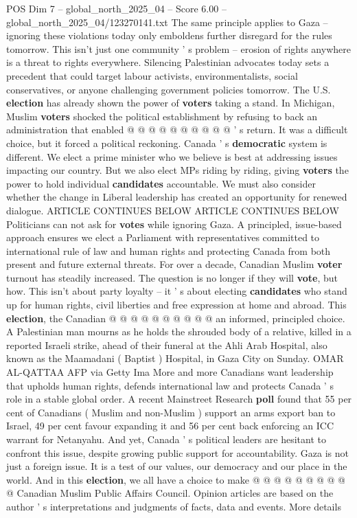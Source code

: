 \begin{textsample}{POS Dim 7 – global\_north\_2025\_04 – Score 6.00 – global\_north\_2025\_04/123270141.txt}
The same principle applies to Gaza -- ignoring these violations today only emboldens further disregard for the rules tomorrow.
This isn't just one community ' s problem -- erosion of rights anywhere is a threat to rights everywhere.
Silencing Palestinian advocates today sets a precedent that could target labour activists, environmentalists, social conservatives, or anyone challenging government policies tomorrow.
The U.S. \textbf{election} has already shown the power of \textbf{voters} taking a stand.
In Michigan, Muslim \textbf{voters} shocked the political establishment by refusing to back an administration that enabled @ @ @ @ @ @ @ @ @ @ ' s return.
It was a difficult choice, but it forced a political reckoning.
Canada ' s \textbf{democratic} system is different.
We elect a prime minister who we believe is best at addressing issues impacting our country.
But we also elect MPs riding by riding, giving \textbf{voters} the power to hold individual \textbf{candidates} accountable.
We must also consider whether the change in Liberal leadership has created an opportunity for renewed dialogue.
ARTICLE CONTINUES BELOW ARTICLE CONTINUES BELOW Politicians can not ask for \textbf{votes} while ignoring Gaza.
A principled, issue-based approach ensures we elect a Parliament with representatives committed to international rule of law and human rights and protecting Canada from both present and future external threats.
For over a decade, Canadian Muslim \textbf{voter} turnout has steadily increased.
The question is no longer if they will \textbf{vote}, but how.
This isn't about party loyalty -- it ' s about electing \textbf{candidates} who stand up for human rights, civil liberties and free expression at home and abroad.
This \textbf{election}, the Canadian @ @ @ @ @ @ @ @ @ @ an informed, principled choice.
A Palestinian man mourns as he holds the shrouded body of a relative, killed in a reported Israeli strike, ahead of their funeral at the Ahli Arab Hospital, also known as the Maamadani ( Baptist ) Hospital, in Gaza City on Sunday.
OMAR AL-QATTAA AFP via Getty Ima More and more Canadians want leadership that upholds human rights, defends international law and protects Canada ' s role in a stable global order.
A recent Mainstreet Research \textbf{poll} found that 55 per cent of Canadians ( Muslim and non-Muslim ) support an arms export ban to Israel, 49 per cent favour expanding it and 56 per cent back enforcing an ICC warrant for Netanyahu.
And yet, Canada ' s political leaders are hesitant to confront this issue, despite growing public support for accountability.
Gaza is not just a foreign issue.
It is a test of our values, our democracy and our place in the world.
And in this \textbf{election}, we all have a choice to make @ @ @ @ @ @ @ @ @ @ Canadian Muslim Public Affairs Council.
Opinion articles are based on the author ' s interpretations and judgments of facts, data and events.
More details

\end{textsample}
